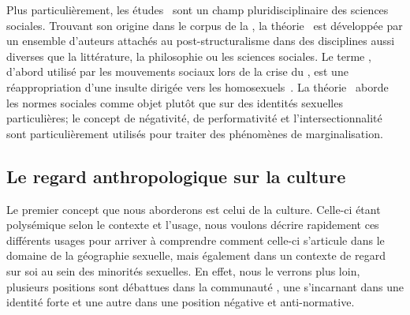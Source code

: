 Plus particulièrement, les études \qus\ sont un champ pluridisciplinaire des sciences sociales. 
Trouvant son origine dans le corpus de la , la théorie \qu\ est développée par un ensemble d'auteurs attachés au post-structuralisme dans des disciplines aussi diverses que la littérature, la philosophie ou les sciences sociales. 
Le terme \qu, d'abord utilisé par les mouvements sociaux \lgbt{} lors de la crise du \sida, est une réappropriation d'une insulte dirigée vers les homosexuels~\citep{Laprade2014}.
La théorie \qu\ aborde les normes sociales comme objet plutôt que sur des identités sexuelles particulières; le concept de négativité, de performativité et l'intersectionnalité sont particulièrement utilisés pour traiter des phénomènes de marginalisation.

\subsection{Le regard anthropologique sur la culture}
\label{subsec:le_regard_anthropologique_sur_la_culture} 
Le premier concept que nous aborderons est celui de la culture. 
Celle-ci étant polysémique selon le contexte et l'usage, nous voulons décrire rapidement ces différents usages pour arriver à comprendre comment celle-ci s'articule dans le domaine de la géographie sexuelle, mais également dans un contexte de regard sur soi au sein des minorités sexuelles. 
En effet, nous le verrons plus loin, plusieurs positions sont débattues dans la communauté \lgbt{}, une s'incarnant dans une identité forte et une autre dans une position négative et anti-normative.


